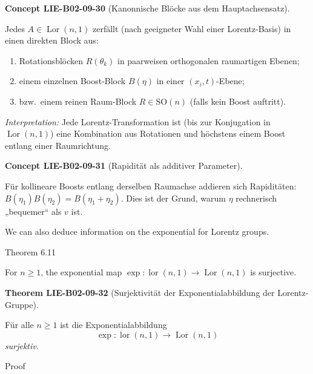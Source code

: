 \documentclass[10pt, letterpaper]{article}
\newcommand{\CustomHeading}[3]{%
  \par\medskip\noindent%
  \textbf{#1 #2} \textnormal{(#3)}.\enskip%
}
\newenvironment{THEO}[2]{\begin{unitbox}\CustomHeading{Theorem}{#1}{#2}}{\end{unitbox}}
\newenvironment{CONC}[2]{\begin{unitbox}\CustomHeading{Concept}{#1}{#2}}{\end{unitbox}}
\begin{document}
\begin{CONC}{LIE-B02-09-30}{Kanonnische Blöcke aus dem Hauptachsensatz}
Jedes $A\in\operatorname{Lor}(n,1)$ zerfällt (nach geeigneter Wahl einer Lorentz-Basis) in einen direkten Block aus:
\begin{enumerate}
\item Rotationsblöcken $R(\theta_k)$ in paarweisen orthogonalen raumartigen Ebenen;
\item einem einzelnen Boost-Block $B(\eta)$ in einer $(x_i,t)$-Ebene;
\item bzw.\ einem reinen Raum-Block $R\in \mathrm{SO}(n)$ (falls kein Boost auftritt).
\end{enumerate}
\emph{Interpretation:} Jede Lorentz-Transformation ist (bis zur Konjugation in $\operatorname{Lor}(n,1)$) eine Kombination aus Rotationen und höchstens einem Boost entlang einer Raumrichtung.
\end{CONC}



\begin{CONC}{LIE-B02-09-31}{Rapidität als additiver Parameter}
Für kollineare Boosts entlang derselben Raumachse addieren sich Rapiditäten:
\(
B(\eta_1)B(\eta_2)=B(\eta_1+\eta_2).
\)
Dies ist der Grund, warum $\eta$ rechnerisch „bequemer“ als $v$ ist.
\end{CONC}




We can also deduce information on the exponential for Lorentz groups.

Theorem 6.11


For $n \geqslant 1$, the exponential map $\exp : \operatorname{lor}(n, 1) \longrightarrow \operatorname{Lor}(n, 1)$ is surjective.


\begin{THEO}{LIE-B02-09-32}{Surjektivität der Exponentialabbildung der Lorentz-Gruppe}
Für alle $n \geqslant 1$ ist die Exponentialabbildung
\[
\exp : \operatorname{lor}(n,1) \longrightarrow \operatorname{Lor}(n,1)
\]
\emph{surjektiv}.
\end{THEO}



Proof
\end{document}
